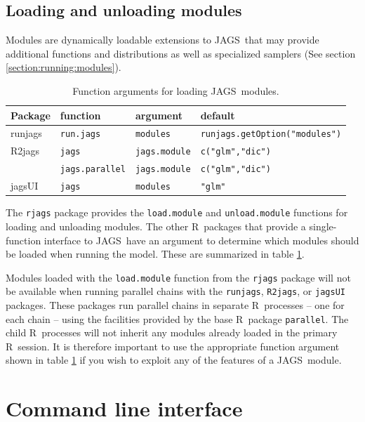 \documentclass[11pt, a4paper, titlepage]{report}
\newcommand{\JAGS}{\textsf{JAGS}}
\newcommand{\R}{\textsf{R}}
\begin{document}
\section{Loading and unloading modules}
\label{section:R:modules}

Modules are dynamically loadable extensions to \JAGS\ that may provide
additional functions and distributions as well as specialized
samplers (See section \ref{section:running:modules}).

\begin{table}
\begin{tabular}{llll}
  \hline
  Package & function & argument & default \\
  \hline
  runjags & \texttt{run.jags} & \texttt{modules} & \texttt{runjags.getOption("modules")} \\
  R2jags  & \texttt{jags} & \texttt{jags.module} & \texttt{c("glm","dic")} \\
  & \texttt{jags.parallel} & \texttt{jags.module} & \texttt{c("glm","dic")} \\
  jagsUI  & \texttt{jags} & \texttt{modules} & \texttt{"glm"} \\
  \hline
\end{tabular}
\caption{Function arguments for loading \JAGS\ modules. \label{table:modules}}
\end{table}

The \texttt{rjags} package provides the \texttt{load.module} and
\texttt{unload.module} functions for loading and unloading
modules. The other \R\ packages that provide a single-function
interface to \JAGS\ have an argument to determine which modules should
be loaded when running the model. These are summarized in table
\ref{table:modules}.

Modules loaded with the \texttt{load.module} function from the
\texttt{rjags} package will not be available when running parallel
chains with the \texttt{runjags}, \texttt{R2jags}, or \texttt{jagsUI}
packages. These packages run parallel chains in separate \R\ processes
-- one for each chain -- using the facilities provided by the base \R\ 
package \texttt{parallel}. The child \R\ processes will not inherit any
modules already loaded in the primary \R\ session. It is therefore
important to use the appropriate function argument shown in table
\ref{table:modules} if you wish to exploit any of the features of a
\JAGS\ module.


\chapter{Command line interface}
\label{chapter:cmdline}
\end{document}
